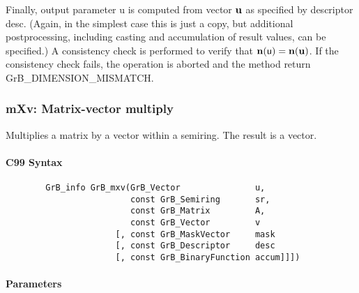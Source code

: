 Finally, output parameter {\sf u} is computed from vector ${\bf u}$
as specified by descriptor {\sf desc}. (Again, in the simplest case this
is just a copy, but additional postprocessing, including casting and
accumulation of result values, can be specified.)  A consistency check is
performed to verify that $\bold{n}({\sf u}) = \bold{n}({\bf u})$. If
the consistency check fails, the operation is aborted and the method
return {\sf GrB\_DIMENSION\_MISMATCH}.

 


\subsubsection{{\sf mXv}: Matrix-vector multiply}

Multiplies a matrix by a vector within a semiring. The result is a vector.

\paragraph{C99 Syntax}

\begin{verbatim}
        GrB_info GrB_mxv(GrB_Vector               u,
                         const GrB_Semiring       sr, 
                         const GrB_Matrix         A,
                         const GrB_Vector         v
                      [, const GrB_MaskVector     mask
                      [, const GrB_Descriptor     desc
                      [, const GrB_BinaryFunction accum]]])
\end{verbatim}

\paragraph{Parameters}

